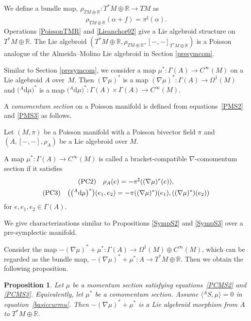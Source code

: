 \documentclass[pdftex]{sigma}
\numberwithin{equation}{section}
\newtheorem{Proposition}[Theorem]{Proposition}
 { \theoremstyle{definition}
\newtheorem{Definition}[Theorem]{Definition}
\newtheorem{Note}[Theorem]{Note}
\newtheorem{Example}[Theorem]{Example}
\newtheorem{Remark}[Theorem]{Remark}
\newtheorem{Question}[Theorem]{Question}
 }
\def\bR{{\mathbb{R}}}
\newcommand{\rhoa}{{\rho_A}}
\newcommand{\rhotr}{\rho_{TM \oplus \bR}}
\newcommand{\rd}{\mathrm{d}}
\begin{document}
We define a bundle map,
$\rhotr\colon T^*M \oplus \bR \rightarrow TM$ as
\begin{gather}
\rhotr(\alpha + f) = \pi^{\sharp} (\alpha).
\label{Lieanchor02}
\end{gather}
Operations \eqref{PoissonTMR} and \eqref{Lieanchor02} give a Lie algebroid
structure on $T^*M \oplus \bR$.
The Lie algebroid $(T^*M \oplus \bR, \rhotr, [-,-]_{T^*M \oplus \bR})$
is a Poisson analogue of the Almeida--Molino Lie algebroid in Section
\ref{presymcom}.

Similar to Section \ref{presymcom}, we consider a map
$\mu^*\colon\Gamma(A) \rightarrow C^{\infty}(M)$ on
a Lie algebroid $A$ over~$M$.
Then $(\nabla \mu)^*$ is a map
$(\nabla \mu)^*\colon \Gamma(A) \rightarrow \Omega^1(M)$
and $\bigl({}^A \rd \mu\bigr)^*$ is a map
$\bigl({}^A \rd \mu\bigr)^*\colon \Gamma(A) \times \Gamma(A) \rightarrow C^{\infty}(M)$.

A \textit{comomentum section} on a Poisson manifold is defined from
equations~\eqref{PMS2} and \eqref{PMS3} as follows.
\begin{Definition}\label{comomPois}
Let $(M, \pi)$ be a Poisson manifold with a Poisson bivector field $\pi$
and $(A, [-,-], \rhoa)$ be a Lie algebroid over $M$.

A map $\mu^*\colon \Gamma(A) \rightarrow C^{\infty}(M)$ is called a bracket-compatible $\nabla$-comomentum section if it satisfies
\begin{gather}
{\rm (PC2)} \quad
 \rhoa(e) = - \pi^{\sharp} ((\nabla \mu)^*(e)),
\label{PCMS2}
\\
{\rm (PC3)} \quad \bigl(\bigl({}^A \rd \mu\bigr)^*\bigr) (e_1, e_2) = - \pi((\nabla \mu)^*)(e_1), ((\nabla \mu)^*)(e_2))
\label{PCMS3}
\end{gather}
for $e, e_1, e_2 \in \Gamma(A)$.
\end{Definition}


We give characterizations similar to Propositions \ref{SympS2} and \ref{SympS3}
over a pre-symplectic manifold.


Consider the map
$-(\nabla \mu)^* + \mu^*\colon \Gamma(A) \rightarrow \Omega^1(M) \oplus C^{\infty}(M)$,
which can be regarded as the bundle map,
$- (\nabla \mu)^* + \mu^*\colon A \rightarrow T^*M \oplus \bR$.
Then we obtain the following proposition.
\begin{Proposition}\label{PoisP3}
Let $\mu$ be a momentum section satisfying equations~\eqref{PCMS2} and \eqref{PCMS3}. Equivalently, let $\mu^*$ be a comomentum section.
Assume $\bigl\langle {}^A S,\mu\bigr\rangle = 0$ in equation~\eqref{basiccurmu}.
Then $-(\nabla \mu)^* + \mu^*$ is a Lie algebroid morphism
from $A$ to $T^*M \oplus \bR$.
\end{Proposition}
\end{document}

